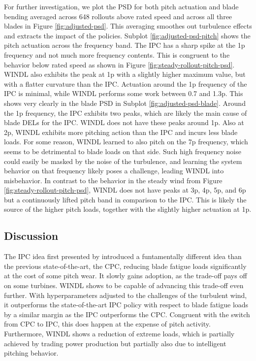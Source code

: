 For further investigation, we plot the \ac{PSD} for both pitch actuation and blade bending averaged across 648 rollouts above rated speed and across all three blades in Figure \ref{fig:adjusted-psd}. This averaging smoothes out turbulence effects and extracts the impact of the policies. Subplot \ref{fig:adjusted-psd-pitch} shows the pitch actuation across the frequency band. The IPC has a sharp spike at the 1p frequency and not much more frequency contents. This is congruent to the behavior below rated speed as shown in Figure \ref{fig:steady-rollout-pitch-psd}. WINDL also exhibits the peak at 1p with a slightly higher maximum value, but with a flatter curvature than the IPC. Actuation around the 1p frequency of the IPC is minimal, while WINDL performs some work between 0.7 and 1.3p. This shows very clearly in the blade PSD in Subplot \ref{fig:adjusted-psd-blade}. Around the 1p frequency, the IPC exhibits two peaks, which are likely the main cause of blade DELs for the IPC. WINDL does not have these peaks around 1p. Also at 2p, WINDL exhibits more pitching action than the IPC and incurs less blade loads. For some reason, WINDL learned to also pitch on the 7p frequency, which seems to be detrimental to blade loads on that side. Such high frequency noise could easily be masked by the noise of the turbulence, and learning the system behavior on that frequency likely poses a challenge, leading WINDL into misbehavior. In contrast to the behavior in the steady wind from Figure \ref{fig:steady-rollout-pitch-psd}, WINDL does not have peaks at 3p, 4p, 5p, and 6p but a continuously lifted pitch band in comparison to the IPC. This is likely the source of the higher pitch loads, together with the slightly higher actuation at 1p. 

\subsection{Discussion}

The IPC idea first presented by \citet{bossanyiIndividualBladePitch2003} introduced a funtamentally different idea than the previous state-of-the-art, the CPC, reducing blade fatigue loads significantly at the cost of some pitch wear. It slowly gains adoption, as the trade-off pays off on some turbines. WINDL shows to be capable of advancing this trade-off even further. With hyperparameters adjusted to the challenges of the turbulent wind, it outperforms the state-of-the-art IPC policy with respect to blade fatigue loads by a similar margin as the IPC outperforms the CPC. Congruent with the switch from CPC to IPC, this does happen at the expense of pitch activity. Furthermore, WINDL shows a reduction of extreme loads, which is partially achieved by trading power production but partially also due to intelligent pitching behavior. 

